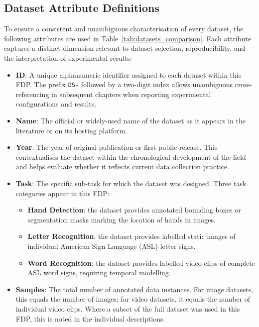 \subsection{Dataset Attribute Definitions}
\label{subsec:dataset_attributes}

To ensure a consistent and unambiguous characterisation of every dataset, the following attributes
are used in Table~\ref{tab:datasets_comparison}. Each attribute captures a distinct dimension
relevant to dataset selection, reproducibility, and the interpretation of experimental results:

\begin{itemize}

    \item \textbf{ID}: A unique alphanumeric identifier assigned to each dataset within this FDP. The prefix \texttt{DS-} followed by a two-digit index allows unambiguous cross-referencing in subsequent chapters when reporting experimental configurations and results.

    \item \textbf{Name}: The official or widely-used name of the dataset as it appears in the literature or on its hosting platform.

    \item \textbf{Year}: The year of original publication or first public release. This contextualises the dataset within the chronological development of the field and helps evaluate whether it reflects current data collection practice.

    \item \textbf{Task}: The specific sub-task for which the dataset was designed. Three task categories appear in this FDP:
          \begin{itemize}
              \item \textbf{Hand Detection}: the dataset provides annotated bounding boxes or segmentation masks marking the location of hands in images.
              \item \textbf{Letter Recognition}: the dataset provides labelled static images of individual American Sign Language (ASL) letter signs.
              \item \textbf{Word Recognition}: the dataset provides labelled video clips of complete ASL word signs, requiring temporal modelling.
          \end{itemize}

    \item \textbf{Samples}: The total number of annotated data instances. For image datasets, this equals the number of images; for video datasets, it equals the number of individual video clips. Where a subset of the full dataset was used in this FDP, this is noted in the individual descriptions.


\end{itemize}

